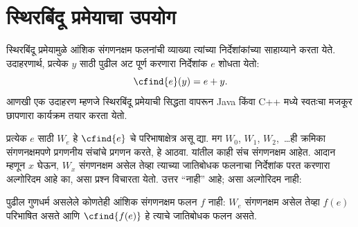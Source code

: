 \section{स्थिरबिंदू प्रमेयाचा उपयोग}\label{cmp:thy:apf:sec}

स्थिरबिंदू प्रमेयामुळे आंशिक संगणनक्षम फलनांची व्याख्या
त्यांच्या निर्देशांकांच्या साहाय्याने करता येते. उदाहरणार्थ,
प्रत्येक $y$ साठी पुढील अट पूर्ण करणारा निर्देशांक $e$
शोधता येतो:
\[\cfind{e}(y) = e + y.
\]
आणखी एक उदाहरण म्हणजे स्थिरबिंदू प्रमेयाची सिद्धता
वापरून Java किंवा C++ मध्ये स्वतःचा मजकूर छापणारा
कार्यक्रम तयार करता येतो.

प्रत्येक $e$ साठी $W_e$ हे $\cfind{e}$ चे परिभाषाक्षेत्र
असू द्या. मग $W_0$, $W_1$, $W_2$,~\dots ही क्रमिका
संगणनक्षमपणे प्रगणनीय संचांचे प्रगणन करते, हे आठवा.
यांतील काही संच संगणनक्षम आहेत. आदान म्हणून $x$
घेऊन, $W_x$ संगणनक्षम असेल तेव्हा त्याच्या जातिबोधक
फलनाचा निर्देशांक परत करणारा अल्गोरिदम आहे का, असा
प्रश्न विचारता येतो. उत्तर ``नाही'' आहे; असा अल्गोरिदम नाही:

\begin{thm}
पुढील गुणधर्म असलेले कोणतेही आंशिक संगणनक्षम फलन $f$
नाही: $W_e$ संगणनक्षम असेल तेव्हा $f(e)$ परिभाषित
असते आणि $\cfind{f(e)}$ हे त्याचे जातिबोधक फलन असते.
\end{thm}

